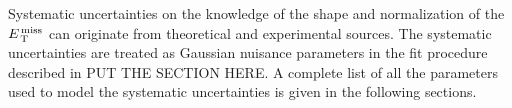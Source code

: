 Systematic uncertainties on the knowledge of the shape and normalization of the
$E_\mathrm{\, T}^\mathrm{\, miss}$ can originate from theoretical and experimental sources. The systematic
uncertainties are treated as Gaussian nuisance parameters in the fit procedure
described in PUT THE SECTION HERE. A complete list of all the parameters used to
model the systematic uncertainties is given in the following sections.
